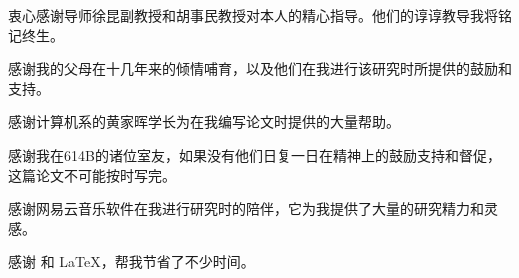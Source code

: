 \begin{acknowledgement}
  衷心感谢导师徐昆副教授和胡事民教授对本人的精心指导。他们的谆谆教导我将铭记终生。

  感谢我的父母在十几年来的倾情哺育，以及他们在我进行该研究时所提供的鼓励和支持。

  感谢计算机系的黄家晖学长为在我编写论文时提供的大量帮助。
  
  感谢我在614B的诸位室友，如果没有他们日复一日在精神上的鼓励支持和督促，这篇论文不可能按时写完。

  感谢网易云音乐软件在我进行研究时的陪伴，它为我提供了大量的研究精力和灵感。

  感谢 \thuthesis\cite{thuthesis} 和 \LaTeX，帮我节省了不少时间。

\end{acknowledgement}
